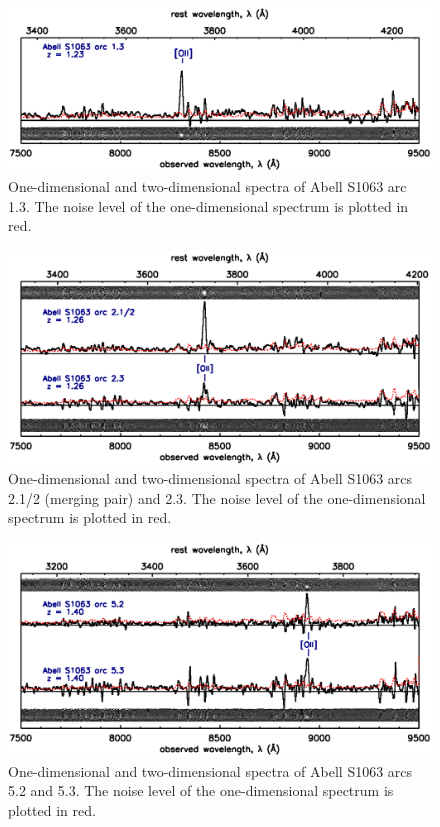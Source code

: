 \begin{figure}[h]
\includegraphics[width=\textwidth]{Chap2/c2f10.eps}
\caption[Abell S1063, arc 1.3 spectrum]{One-dimensional and two-dimensional spectra of Abell S1063 arc 1.3. The noise level of the one-dimensional spectrum is plotted in red.}
\label{app:fig:as1063_spec1_3}
\end{figure}

\begin{figure}[h]
\includegraphics[width=\textwidth]{Chap2/c2f11.eps}
\caption[Abell S1063, arc 2.1/2 and 2.3 spectra]{One-dimensional and two-dimensional spectra of Abell S1063 arcs 2.1/2 (merging pair) and 2.3. The noise level of the one-dimensional spectrum is plotted in red.}
\label{app:fig:as1063_spec2}
\end{figure}

\begin{figure}[h]
\includegraphics[width=\textwidth]{Chap2/c2f12.eps}
\caption[Abell S1063, arc 5.2 and 5.3 spectra]{One-dimensional and two-dimensional spectra of Abell S1063 arcs 5.2 and 5.3. The noise level of the one-dimensional spectrum is plotted in red.}
\label{app:fig:as1063_spec5}
\end{figure}

